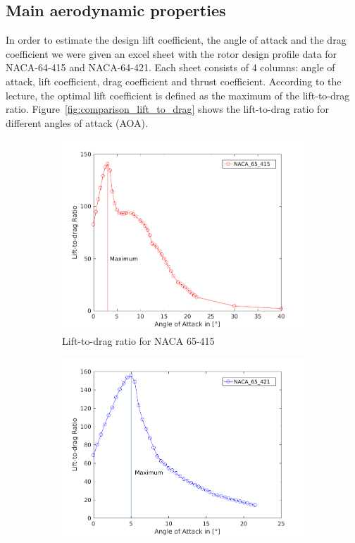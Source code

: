 \documentclass[10pt]{article}
\begin{document}
\subsection{Main aerodynamic properties}
In order to estimate the design lift coefficient, the angle of attack and the drag coefficient we were given an excel sheet with the rotor design profile data for NACA-64-415 and NACA-64-421.
Each sheet consists of 4 columns: angle of attack, lift coefficient, drag coefficient and thrust coefficient. According to the lecture, the optimal lift coefficient is defined as the maximum of the lift-to-drag ratio. Figure~\ref{fig:comparison_lift_to_drag} shows the lift-to-drag ratio for different angles of attack (AOA).

\begin{figure}[htb!]
\begin{subfigure}{0.5\textwidth}
  \centering
  \includegraphics[width=1\linewidth]{../CIP_1/lift_to_drag_ratio_415.png}
  \caption{Lift-to-drag ratio for NACA 65-415}
\end{subfigure}
\begin{subfigure}{0.5\textwidth}
  \centering
  \includegraphics[width=1\linewidth]{../CIP_1/lift_to_drag_ratio_421.png}

\end{subfigure}
\end{figure}
\end{document}
